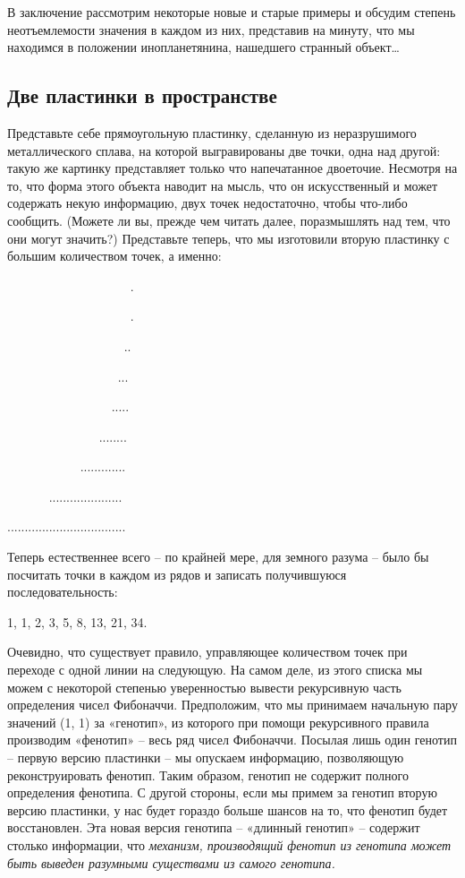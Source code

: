 \documentclass[../main.tex]{subfiles}
\begin{document}
В заключение рассмотрим некоторые новые и старые примеры и обсудим степень неотъемлемости значения в каждом из них, представив на минуту, что мы находимся в положении инопланетянина, нашедшего странный объект\ldots{}


\subsection{Две пластинки в пространстве}

Представьте себе прямоугольную пластинку, сделанную из неразрушимого металлического сплава, на которой выгравированы две точки, одна над другой: такую же картинку представляет только что напечатанное двоеточие. Несмотря на то, что форма этого объекта наводит на мысль, что он искусственный и может содержать некую информацию, двух точек недостаточно, чтобы что-либо сообщить. (Можете ли вы, прежде чем читать далее, поразмышлять над тем, что они могут значить?) Представьте теперь, что мы изготовили вторую пластинку с большим количеством точек, а именно:

~~~~~~~~~~~~~~~~~~~ .

~~~~~~~~~~~~~~~~~~~ .

~~~~~~~~~~~~~~~~~~ ..

~~~~~~~~~~~~~~~~~ ...

~~~~~~~~~~~~~~~~ .....

~~~~~~~~~~~~~~ ........

~~~~~~~~~~~ .............

~~~~~~ .....................

..................................

Теперь естественнее всего \--- по крайней мере, для земного разума \--- было бы посчитать точки в каждом из рядов и записать получившуюся последовательность:

1, 1, 2, 3, 5, 8, 13, 21, 34.

Очевидно, что существует правило, управляющее количеством точек при переходе с одной линии на следующую. На самом деле, из этого списка мы можем с некоторой степенью уверенностью вывести рекурсивную часть определения чисел Фибоначчи. Предположим, что мы принимаем начальную пару значений (1, 1) за «генотип», из которого при помощи рекурсивного правила производим «фенотип» \--- весь ряд чисел Фибоначчи. Посылая лишь один генотип \--- первую версию пластинки \--- мы опускаем информацию, позволяющую реконструировать фенотип. Таким образом, генотип не содержит полного определения фенотипа. С другой стороны, если мы примем за генотип вторую версию пластинки, у нас будет гораздо больше шансов на то, что фенотип будет восстановлен. Эта новая версия генотипа \--- «длинный генотип» \--- содержит столько информации, что \emph{механизм, производящий фенотип из генотипа может быть выведен разумными существами из самого генотипа.}
\end{document}
